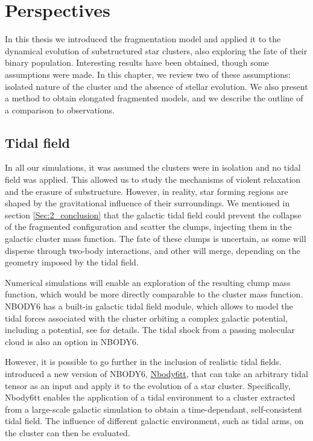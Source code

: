 \chapter{Perspectives}

In this thesis we introduced the \HubLem fragmentation model and applied it to the dynamical evolution of substructured star clusters, also exploring the fate of their binary population. Interesting results have been obtained, though some assumptions were made. In this chapter, we review two of these assumptions:  isolated nature of the cluster and the absence of stellar evolution.  We also present a method to obtain elongated fragmented models, and we describe the outline of a comparison to observations.


\minitoc



\section{Tidal field}

In all our simulations, it was assumed the clusters were in isolation and no tidal field was applied. This allowed us to study the mechanisms of violent relaxation and the erasure of substructure. However, in reality, star forming regions are shaped by the gravitational influence of their surroundings. We mentioned in section \ref{Sec:2_conclusion} that the galactic tidal field could prevent the collapse of the \HubLem fragmented configuration and scatter the clumps, injecting them in the galactic cluster mass function. The fate of these clumps is uncertain, as some will disperse through two-body interactions, and other will merge, depending on the geometry imposed by the tidal field. 

Numerical simulations will enable an exploration of the resulting clump mass function, which would be more directly comparable to the cluster mass function. NBODY6 has a built-in galactic tidal field module, which allows to model the tidal forces associated with the cluster orbiting a complex galactic potential, including a \cite{Miyamoto1975} potential, see \cite{Aarseth2003} for details. The tidal shock from a passing molecular cloud is also an option in NBODY6.

However, it is possible to go further in the inclusion of realistic tidal fields. \cite{Renaud2011} introduced a new version of NBODY6, \href{http://personal.ph.surrey.ac.uk/~fr0005/nbody6tt.php}{Nbody6tt}, that can take an arbitrary tidal tensor as an input and apply it to the evolution of a star cluster. Specifically, Nbody6tt enables the application of a tidal environment to a cluster  extracted from a large-scale galactic simulation to obtain a time-dependant, self-consistent tidal field. The influence of different galactic environment, such as tidal arms, on the cluster can then be evaluated. 

